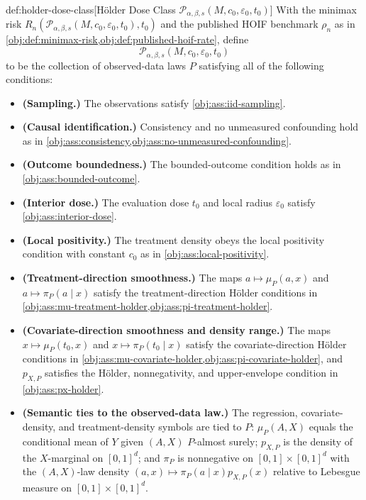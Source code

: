 \begin{definitionv}{def:holder-dose-class}[Hölder Dose Class \(\mathcal P_{\alpha,\beta,s}(M,c_0,\varepsilon_0,t_0)\)]
With the minimax risk \(R_n(\mathcal P_{\alpha,\beta,s}(M,c_0,\varepsilon_0,t_0),t_0)\) and the published HOIF benchmark \(\rho_n\) as in \cref{obj:def:minimax-risk,obj:def:published-hoif-rate}, define
\[
\mathcal P_{\alpha,\beta,s}(M,c_0,\varepsilon_0,t_0)
\]
to be the collection of observed-data laws \(P\) satisfying all of the following conditions:
\begin{itemize}
\item \textbf{(Sampling.)} The observations satisfy \cref{obj:ass:iid-sampling}.
\item \textbf{(Causal identification.)} Consistency and no unmeasured confounding hold as in \cref{obj:ass:consistency,obj:ass:no-unmeasured-confounding}.
\item \textbf{(Outcome boundedness.)} The bounded-outcome condition holds as in \cref{obj:ass:bounded-outcome}.
\item \textbf{(Interior dose.)} The evaluation dose \(t_0\) and local radius \(\varepsilon_0\) satisfy \cref{obj:ass:interior-dose}.
\item \textbf{(Local positivity.)} The treatment density obeys the local positivity condition with constant \(c_0\) as in \cref{obj:ass:local-positivity}.
\item \textbf{(Treatment-direction smoothness.)} The maps \(a\mapsto \mu_P(a,x)\) and \(a\mapsto \pi_P(a\mid x)\) satisfy the treatment-direction Hölder conditions in \cref{obj:ass:mu-treatment-holder,obj:ass:pi-treatment-holder}.
\item \textbf{(Covariate-direction smoothness and density range.)} The maps \(x\mapsto\mu_P(t_0,x)\) and \(x\mapsto\pi_P(t_0\mid x)\) satisfy the covariate-direction Hölder conditions in \cref{obj:ass:mu-covariate-holder,obj:ass:pi-covariate-holder}, and \(p_{X,P}\) satisfies the Hölder, nonnegativity, and upper-envelope condition in \cref{obj:ass:px-holder}.
\item \textbf{(Semantic ties to the observed-data law.)} The regression, covariate-density, and treatment-density symbols are tied to \(P\): \(\mu_P(A,X)\) equals the conditional mean of \(Y\) given \((A,X)\) \(P\)-almost surely; \(p_{X,P}\) is the density of the \(X\)-marginal on \([0,1]^d\); and \(\pi_P\) is nonnegative on \([0,1]\times[0,1]^d\) with the \((A,X)\)-law density \((a,x)\mapsto \pi_P(a\mid x)p_{X,P}(x)\) relative to Lebesgue measure on \([0,1]\times[0,1]^d\).
\end{itemize}
\end{definitionv}

